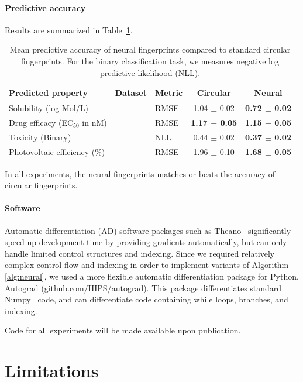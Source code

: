 \documentclass{article}
\begin{document}
\paragraph{Predictive accuracy}
Results are summarized in Table~\ref{table:main results}.
%
\begin{table}
\begin{tabular}{lll|cc}
Predicted property              & Dataset                     & Metric & Circular        & Neural   \\
\midrule
Solubility (log Mol/L)          & \citet{delaney_data_2004}   &   RMSE & 1.04 $\pm$ 0.02 & \bf{0.72} $\pm$ 0.02 \\
Drug efficacy (EC$_{50}$ in nM) & \citet{gamo2010thousands}   &   RMSE & \bf{1.17} $\pm$ 0.05 & \bf{1.15} $\pm$ 0.05 \\
Toxicity (Binary)               & \citet{tox21}               &   NLL  & 0.44 $\pm$ 0.02  & \bf{0.37} $\pm$ 0.02 \\
Photovoltaic efficiency (\%)    & \citet{hachmann2011harvard} &  RMSE  & 1.96 $\pm$ 0.10  & \bf{1.68} $\pm$ 0.05
\end{tabular}
\label{table:main results}
\caption{Mean predictive accuracy of neural fingerprints compared to standard circular fingerprints.
For the binary classification task, we measures negative log predictive likelihood (NLL).}
\end{table}
%
In all experiments, the neural fingerprints matches or beats the accuracy of circular fingerprints.

\paragraph{Software}
Automatic differentiation (AD) software packages such as
Theano~\citep{Bastien-Theano-2012} significantly speed up development time by providing gradients automatically, but can only handle limited control structures and indexing.
Since we required relatively complex control flow and indexing in order to implement variants of Algorithm \ref{alg:neural}, we used a more flexible automatic differentiation package for Python, Autograd (\url{github.com/HIPS/autograd)}.
This package differentiates standard Numpy~\citep{oliphant2007python} code, and can differentiate code containing while loops, branches, and indexing.

Code for all experiments will be made available upon publication.

\section{Limitations}
\end{document}

